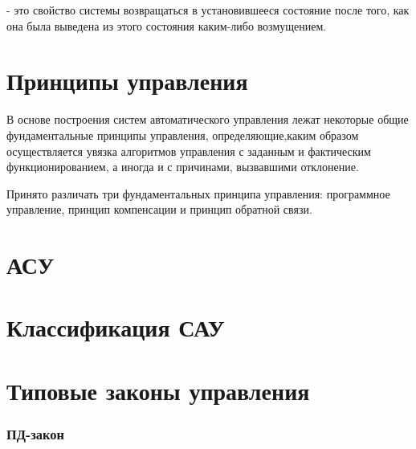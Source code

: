 \documentclass[TAU.tex]{subfiles}
\begin{document}
 - это свойство системы возвращаться в установившееся состояние после того, как она была выведена из этого состояния каким-либо возмущением. 
\section{Принципы управления}
В основе построения систем автоматического управления лежат некоторые общие фундаментальные принципы управления, определяющие,каким образом осуществляется увязка алгоритмов управления с заданным и фактическим функционированием, а иногда и с причинами, вызвавшими отклонение.\par
Принято различать три фундаментальных принципа управления: программное управление, принцип компенсации и принцип обратной связи.

\section{АСУ}

\section{Классификация САУ}

\section{Типовые законы управления}
\subsubsection{ПД-закон}
\end{document}
